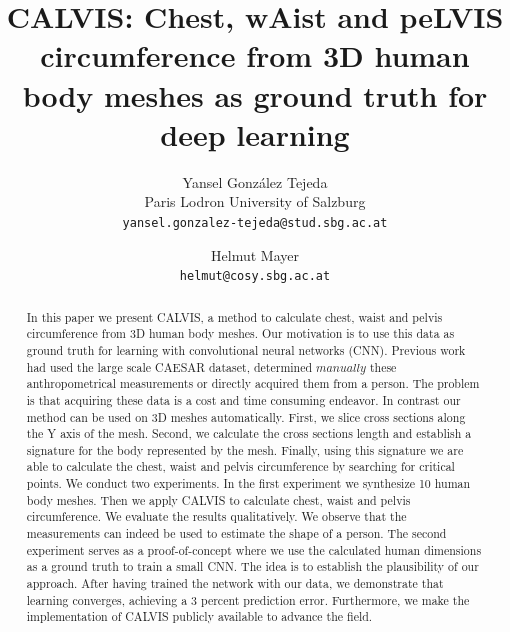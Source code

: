 \documentclass[10pt,twocolumn,letterpaper]{article}
\begin{document}
\title{CALVIS: Chest, wAist and peLVIS circumference from 3D human body meshes 
as ground truth for deep learning}

\author{Yansel González Tejeda\\
Paris Lodron University of Salzburg\\
{\tt\small yansel.gonzalez-tejeda@stud.sbg.ac.at}
\and
Helmut Mayer\\
{\tt\small helmut@cosy.sbg.ac.at}
}

\maketitle
\ificcvfinal\thispagestyle{empty}\fi

\begin{abstract}
   In this paper we present CALVIS, a method to calculate chest, waist and 
   pelvis circumference from 3D human body meshes. Our motivation is to use 
   this data as ground truth for learning with convolutional neural networks 
   (CNN). Previous work had used the large scale CAESAR dataset, determined 
   $\textit{manually}$ these anthropometrical measurements or directly acquired 
   them from a person. The problem is that acquiring these data is a cost and 
   time consuming endeavor. In contrast our method can be used on 
   3D meshes automatically. First, we slice cross sections along the Y axis of 
   the mesh. Second, we calculate the cross sections length and establish a 
   signature for the body represented by the mesh. Finally, using this 
   signature we are able to calculate the chest, waist and pelvis 
   circumference by searching for critical points. We conduct two experiments. 
   In the first experiment we synthesize 10 human body meshes. Then we apply 
   CALVIS to calculate chest, waist and pelvis circumference. We evaluate the 
   results qualitatively. We observe that the measurements can indeed be used 
   to estimate the shape of a person. The second experiment serves as a 
   proof-of-concept where we use the calculated human dimensions as a ground 
   truth to train a small CNN. The idea is to establish the plausibility of our 
   approach. After having trained the network with our data, we demonstrate 
   that learning converges, achieving a 3 percent prediction error. 
   Furthermore, we make the implementation of CALVIS publicly available to 
   advance the field.
\end{abstract}
\end{document}
